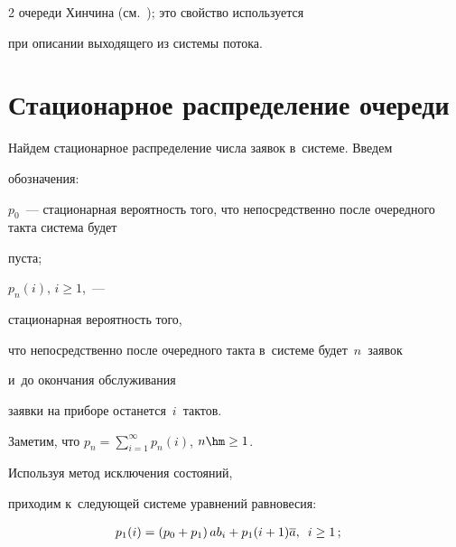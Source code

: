 \begin{multicols}{2}
очереди Хинчина (см.~\cite[п.~4.1.1]{distime}); это свойство используется

при описании выходящего из системы потока.



\vspace*{-6pt}





\section{Стационарное распределение очереди}



\vspace*{-2pt}



Найдем стационарное распределение числа заявок в~системе. Введем

обозначения:

\begin{description}

\item

$p_0$~--- стационарная вероятность того, что непосредственно после очередного такта система будет

пуста;

\item

$p_n(i)$, $i \ge 1$,~---

стационарная вероятность того,

что непосредственно после очередного такта в~системе будет~$n$~заявок 

и~до окончания обслуживания

заявки на приборе останется~$i$~тактов.

\end{description}



Заметим, что $p_n = \sum\nolimits_{i=1}^{\infty} p_n(i)$, $n \hm\ge 1$.

Используя метод исключения состояний,

приходим к~сле\-ду\-ющей системе уравнений равновесия:

\begin{align}

\label{ver1-new}

\!p_1(i) &=\left(p_0 + p_1 \right)a b_i+

p_1(i+1)\overline{a},\enskip  i \ge 1\,;


\end{align}
\end{multicols}
